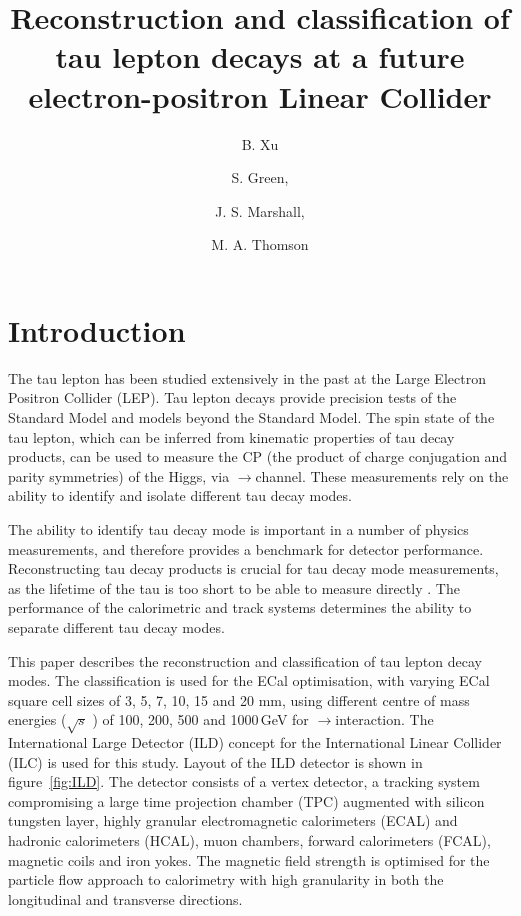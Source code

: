 \documentclass[a4paper,11pt]{article}
\title{\boldmath Reconstruction and classification of tau lepton decays at a future electron-positron Linear Collider}
\author{B. Xu}
\author{S. Green,}
\author{J. S. Marshall,}
\author{M. A. Thomson}
\affiliation{Cavendish Laboratory, University of Cambridge,\\JJ Thomson Avenue, Cambridge, CB3 0HE, UK}
\newcommand{\higgsToTauTau}{\PHiggs$\to$\PGtp\PGtm }
\newcommand{\eeToTauTau}{\Pep\Pem$\to$\PGtp\PGtm}
\newcommand{\rootS}{\ensuremath{\sqrt{s}} }
\begin{document}
\maketitle
\flushbottom


\section{Introduction}

The tau lepton has been studied extensively in the past at the Large Electron Positron Collider (LEP)\cite{Schael:2005am}. Tau lepton decays  provide precision tests of the Standard Model and models beyond the Standard Model\cite{Riles:1992rd}. The spin state of the tau lepton, which can be inferred from kinematic properties of tau decay products, can be used to measure the CP (the product of charge conjugation and parity symmetries) of the Higgs, via \higgsToTauTau channel\cite{Berge:2015nua}.  These measurements rely on the ability to identify and isolate different tau decay modes.

The ability to identify tau decay mode is important in a number of physics measurements, and therefore provides a benchmark for detector performance. Reconstructing tau decay products is crucial for tau decay mode measurements, as the lifetime of the tau is too short to be able to measure directly \cite{Abreu:1991jn}. The performance of the calorimetric and track systems determines the ability to separate different tau decay modes.

This paper describes the reconstruction and classification of tau lepton decay modes. The classification is used for the ECal optimisation, with varying ECal square cell sizes of 3, 5, 7, 10, 15 and 20 mm, using different centre of mass energies (\rootS) of 100, 200, 500 and 1000\,GeV for \eeToTauTau interaction. The International Large Detector (ILD) concept \cite{Abe:2010aa} for the International Linear Collider (ILC)\cite{Baer:2013cma} is used for this study. Layout of the ILD detector is shown in figure~\ref{fig:ILD}. The detector consists of a vertex detector, a tracking system compromising a large time projection chamber (TPC) augmented with silicon tungsten layer, highly granular electromagnetic calorimeters (ECAL) and hadronic calorimeters (HCAL), muon chambers, forward calorimeters (FCAL), magnetic coils and iron yokes. The magnetic field strength is optimised for the particle flow approach\cite{Thomson:2009rp} to calorimetry  with high granularity in both the longitudinal and transverse directions.
\end{document}
